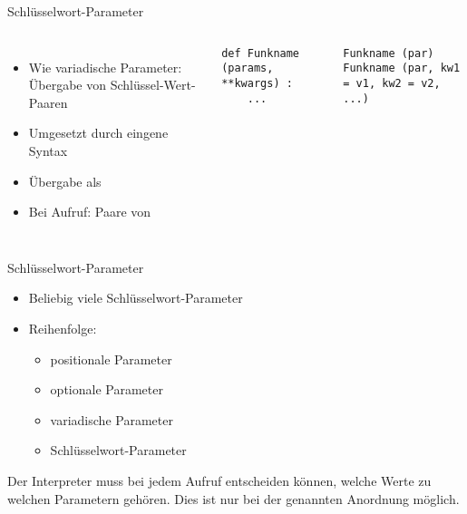 
\begin{frame}[fragile]{Schlüsselwort-Parameter}
%
\begin{columns}[T]
\begin{itemize}
\item Wie variadische Parameter: Übergabe von Schlüssel-Wert-Paaren
\item Umgesetzt durch eingene Syntax
\item Übergabe als 
\item Bei Aufruf: Paare von 
\end{itemize}
%
\begin{codebox}
\begin{verbatim}
def Funkname (params, **kwargs) :
    ...
\end{verbatim}
\end{codebox}
%
\begin{codebox}
\begin{verbatim}
Funkname (par)
Funkname (par, kw1 = v1, kw2 = v2, ...)
\end{verbatim}
\end{codebox}
\end{columns}
%
\end{frame}


\begin{frame}{Schlüsselwort-Parameter}
%
\begin{itemize}
\item Beliebig viele Schlüsselwort-Parameter
\item Reihenfolge:
	\begin{itemize}
	\item positionale Parameter
	\item optionale Parameter
	\item variadische Parameter
	\item Schlüsselwort-Parameter
	\end{itemize}
\end{itemize}
%
\begin{hintbox}
Der Interpreter muss bei jedem Aufruf entscheiden können, welche Werte zu welchen Parametern gehören. Dies ist nur bei der genannten Anordnung möglich.
\end{hintbox}
%
\end{frame}

